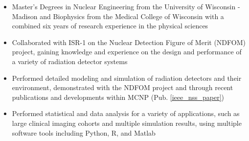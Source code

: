 \begin{center}
\begin{minipage}{\textwidth}
  \begin{itemize}[leftmargin=.15in,rightmargin=.25in,itemsep=1.0mm]

	\item Master's Degrees in Nuclear Engineering from the University of Wisconsin - Madison and Biophysics from the Medical College of Wisconsin with a combined six years of research experience in the physical sciences
		
	\item Collaborated with ISR-1 on the Nuclear Detection Figure of Merit (NDFOM) project, gaining knowledge and experience on the design and performance of a variety of radiation detector systems
	
	\item Performed detailed modeling and simulation of radiation detectors and their environment, demonstrated with the NDFOM project and through recent publications and developments within \textsc{MCNP} (Pub. \ref{ieee_nss_paper})
	\item Performed statistical and data analysis for a variety of applications, such as large clinical imaging cohorts and multiple simulation results, using multiple software tools including Python, R, and Matlab
		

\end{itemize}
\end{minipage}
\end{center}
